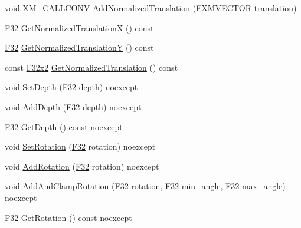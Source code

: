 \begin{DoxyCompactItemize}
\item 
void X\+M\+\_\+\+C\+A\+L\+L\+C\+O\+NV \hyperlink{classmage_1_1_sprite_transform_a167f79e773eeb4dca46915f748726113}{Add\+Normalized\+Translation} (F\+X\+M\+V\+E\+C\+T\+OR translation)
\item 
\hyperlink{namespacemage_aa97e833b45f06d60a0a9c4fc22ae02c0}{F32} \hyperlink{classmage_1_1_sprite_transform_a31bf43cccaf564054930d80e229ebef3}{Get\+Normalized\+TranslationX} () const
\item 
\hyperlink{namespacemage_aa97e833b45f06d60a0a9c4fc22ae02c0}{F32} \hyperlink{classmage_1_1_sprite_transform_a6c5685c5d45391c6d5d820677b58c976}{Get\+Normalized\+TranslationY} () const
\item 
const \hyperlink{namespacemage_aa87237ad091f5cd7da612b8523fc108f}{F32x2} \hyperlink{classmage_1_1_sprite_transform_af77e09289e47b1a5215acec31085f9b3}{Get\+Normalized\+Translation} () const
\item 
void \hyperlink{classmage_1_1_sprite_transform_a99da2aa3c134db3f4a72660befe1ca9a}{Set\+Depth} (\hyperlink{namespacemage_aa97e833b45f06d60a0a9c4fc22ae02c0}{F32} depth) noexcept
\item 
void \hyperlink{classmage_1_1_sprite_transform_a38ba3e38c4397f536e7c1998ef91d3d0}{Add\+Depth} (\hyperlink{namespacemage_aa97e833b45f06d60a0a9c4fc22ae02c0}{F32} depth) noexcept
\item 
\hyperlink{namespacemage_aa97e833b45f06d60a0a9c4fc22ae02c0}{F32} \hyperlink{classmage_1_1_sprite_transform_acbb61149d34be717c43a78fc9113fe9c}{Get\+Depth} () const noexcept
\item 
void \hyperlink{classmage_1_1_sprite_transform_aa5e9162146729dd579e2409e348eafa2}{Set\+Rotation} (\hyperlink{namespacemage_aa97e833b45f06d60a0a9c4fc22ae02c0}{F32} rotation) noexcept
\item 
void \hyperlink{classmage_1_1_sprite_transform_ab189a29372631e74ae5f638243eaa312}{Add\+Rotation} (\hyperlink{namespacemage_aa97e833b45f06d60a0a9c4fc22ae02c0}{F32} rotation) noexcept
\item 
void \hyperlink{classmage_1_1_sprite_transform_a29d41f069bb02f46bae495d1e9a19c9b}{Add\+And\+Clamp\+Rotation} (\hyperlink{namespacemage_aa97e833b45f06d60a0a9c4fc22ae02c0}{F32} rotation, \hyperlink{namespacemage_aa97e833b45f06d60a0a9c4fc22ae02c0}{F32} min\+\_\+angle, \hyperlink{namespacemage_aa97e833b45f06d60a0a9c4fc22ae02c0}{F32} max\+\_\+angle) noexcept
\item 
\hyperlink{namespacemage_aa97e833b45f06d60a0a9c4fc22ae02c0}{F32} \hyperlink{classmage_1_1_sprite_transform_ae7fc2e36ce99ea41a74d53032437dd58}{Get\+Rotation} () const noexcept

\end{DoxyCompactItemize}
